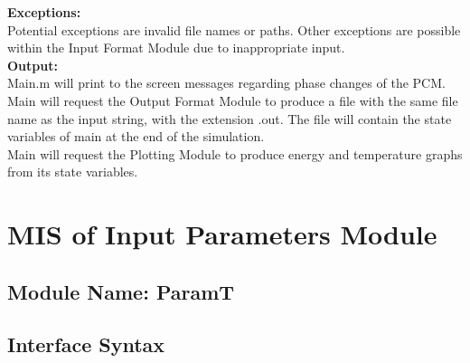 \documentclass[12pt]{article}
\begin{document}
\noindent \textbf{Exceptions:}\\
Potential exceptions are invalid file names or paths. Other exceptions are
possible within the Input Format Module due to inappropriate input.\\

\noindent \textbf{Output:}\\
Main.m will print to the screen messages regarding phase changes of the PCM.\\
Main will request the Output Format Module to produce a file with the  same file
name as the input string, with the extension .out. The file will contain the 
state variables of main at the end of the simulation.\\
Main will request the Plotting Module to produce energy and temperature graphs
from its state variables.


\section{MIS of Input Parameters Module}

\subsection{Module Name: ParamT} %





\subsection{Interface Syntax}
\end{document}
